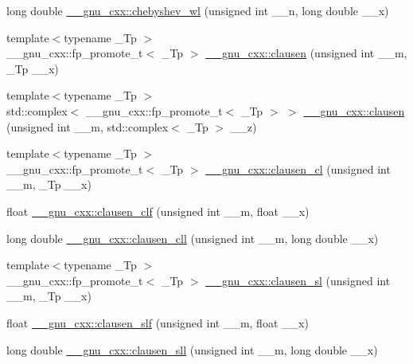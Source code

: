 \begin{DoxyCompactItemize}
\item 
long double \hyperlink{group__mathsf__gnu_ga1297dfd9b9a0f584435de7d83eb9e9c3}{\+\_\+\+\_\+gnu\+\_\+cxx\+::chebyshev\+\_\+wl} (unsigned int \+\_\+\+\_\+n, long double \+\_\+\+\_\+x)
\item 
{\footnotesize template$<$typename \+\_\+\+Tp $>$ }\\\+\_\+\+\_\+gnu\+\_\+cxx\+::fp\+\_\+promote\+\_\+t$<$ \+\_\+\+Tp $>$ \hyperlink{group__mathsf__gnu_ga54e4ba71b1f81718d6998349f91ff88f}{\+\_\+\+\_\+gnu\+\_\+cxx\+::clausen} (unsigned int \+\_\+\+\_\+m, \+\_\+\+Tp \+\_\+\+\_\+x)
\item 
{\footnotesize template$<$typename \+\_\+\+Tp $>$ }\\std\+::complex$<$ \+\_\+\+\_\+gnu\+\_\+cxx\+::fp\+\_\+promote\+\_\+t$<$ \+\_\+\+Tp $>$ $>$ \hyperlink{group__mathsf__gnu_gaf7c4317ef6bfd3a4bf0ddcba22ee7588}{\+\_\+\+\_\+gnu\+\_\+cxx\+::clausen} (unsigned int \+\_\+\+\_\+m, std\+::complex$<$ \+\_\+\+Tp $>$ \+\_\+\+\_\+z)
\item 
{\footnotesize template$<$typename \+\_\+\+Tp $>$ }\\\+\_\+\+\_\+gnu\+\_\+cxx\+::fp\+\_\+promote\+\_\+t$<$ \+\_\+\+Tp $>$ \hyperlink{group__mathsf__gnu_ga8786b86db309998f93f877cfb9bdfd57}{\+\_\+\+\_\+gnu\+\_\+cxx\+::clausen\+\_\+cl} (unsigned int \+\_\+\+\_\+m, \+\_\+\+Tp \+\_\+\+\_\+x)
\item 
float \hyperlink{group__mathsf__gnu_ga5e1bf6c24eb4359ffacb49da62f0838b}{\+\_\+\+\_\+gnu\+\_\+cxx\+::clausen\+\_\+clf} (unsigned int \+\_\+\+\_\+m, float \+\_\+\+\_\+x)
\item 
long double \hyperlink{group__mathsf__gnu_gab06f3c94f96538167147f028711903a9}{\+\_\+\+\_\+gnu\+\_\+cxx\+::clausen\+\_\+cll} (unsigned int \+\_\+\+\_\+m, long double \+\_\+\+\_\+x)
\item 
{\footnotesize template$<$typename \+\_\+\+Tp $>$ }\\\+\_\+\+\_\+gnu\+\_\+cxx\+::fp\+\_\+promote\+\_\+t$<$ \+\_\+\+Tp $>$ \hyperlink{group__mathsf__gnu_gacb757b00309213cd96bb2bc6b5dc3c24}{\+\_\+\+\_\+gnu\+\_\+cxx\+::clausen\+\_\+sl} (unsigned int \+\_\+\+\_\+m, \+\_\+\+Tp \+\_\+\+\_\+x)
\item 
float \hyperlink{group__mathsf__gnu_gadd92821afcbfbdc79496b091b12a357f}{\+\_\+\+\_\+gnu\+\_\+cxx\+::clausen\+\_\+slf} (unsigned int \+\_\+\+\_\+m, float \+\_\+\+\_\+x)
\item 
long double \hyperlink{group__mathsf__gnu_ga227d105b4c0659c4402de7217bb9b65b}{\+\_\+\+\_\+gnu\+\_\+cxx\+::clausen\+\_\+sll} (unsigned int \+\_\+\+\_\+m, long double \+\_\+\+\_\+x)

\end{DoxyCompactItemize}
